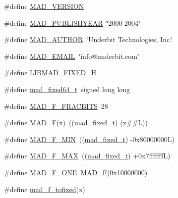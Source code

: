 \begin{DoxyCompactItemize}
\item 
\#define \hyperlink{mac_2config_2i386_2lib-src_2libmad_2mad_8h_ada05ce3820228a7974b7fbfa6a8ac3a2}{M\+A\+D\+\_\+\+V\+E\+R\+S\+I\+ON}
\item 
\#define \hyperlink{mac_2config_2i386_2lib-src_2libmad_2mad_8h_a11c58305e44a2eea0bcb291e89510feb}{M\+A\+D\+\_\+\+P\+U\+B\+L\+I\+S\+H\+Y\+E\+AR}~\char`\"{}2000-\/2004\char`\"{}
\item 
\#define \hyperlink{mac_2config_2i386_2lib-src_2libmad_2mad_8h_addecc1f19e32d59a7d61ce99a135161d}{M\+A\+D\+\_\+\+A\+U\+T\+H\+OR}~\char`\"{}Underbit Technologies, Inc.\char`\"{}
\item 
\#define \hyperlink{mac_2config_2i386_2lib-src_2libmad_2mad_8h_ad068c69e5eb1bc27489c1148e5aa57b1}{M\+A\+D\+\_\+\+E\+M\+A\+IL}~\char`\"{}info@underbit.\+com\char`\"{}
\item 
\#define \hyperlink{mac_2config_2i386_2lib-src_2libmad_2mad_8h_a0988464d4f3536054a7823bbd5a6fe18}{L\+I\+B\+M\+A\+D\+\_\+\+F\+I\+X\+E\+D\+\_\+H}
\item 
\#define \hyperlink{mac_2config_2i386_2lib-src_2libmad_2mad_8h_a283baa2bf012e39c892041bd3bc07479}{mad\+\_\+fixed64\+\_\+t}~signed long long
\item 
\#define \hyperlink{mac_2config_2i386_2lib-src_2libmad_2mad_8h_afe9f395501b4973ab536c13fb8235944}{M\+A\+D\+\_\+\+F\+\_\+\+F\+R\+A\+C\+B\+I\+TS}~28
\item 
\#define \hyperlink{mac_2config_2i386_2lib-src_2libmad_2mad_8h_a15f8a99ff8c6449921db3c15e8b80ed5}{M\+A\+D\+\_\+F}(x)~((\hyperlink{libmad_2fixed_8h_a8a4b50d6d4d6827b7a8c871db1cbfd78}{mad\+\_\+fixed\+\_\+t}) (x\#\#L))
\item 
\#define \hyperlink{mac_2config_2i386_2lib-src_2libmad_2mad_8h_a03929035ef601782a50acba22aaa2dac}{M\+A\+D\+\_\+\+F\+\_\+\+M\+IN}~((\hyperlink{libmad_2fixed_8h_a8a4b50d6d4d6827b7a8c871db1cbfd78}{mad\+\_\+fixed\+\_\+t}) -\/0x80000000\+L)
\item 
\#define \hyperlink{mac_2config_2i386_2lib-src_2libmad_2mad_8h_a67652605773e172bfd88a59f900c5b4f}{M\+A\+D\+\_\+\+F\+\_\+\+M\+AX}~((\hyperlink{libmad_2fixed_8h_a8a4b50d6d4d6827b7a8c871db1cbfd78}{mad\+\_\+fixed\+\_\+t}) +0x7fffffff\+L)
\item 
\#define \hyperlink{mac_2config_2i386_2lib-src_2libmad_2mad_8h_a0e0af3bf1ae6bf41e8e25eaa5606beba}{M\+A\+D\+\_\+\+F\+\_\+\+O\+NE}~\hyperlink{mac_2config_2i386_2lib-src_2libmad_2mad_8h_a15f8a99ff8c6449921db3c15e8b80ed5}{M\+A\+D\+\_\+F}(0x10000000)
\item 
\#define \hyperlink{mac_2config_2i386_2lib-src_2libmad_2mad_8h_a6c173fe62613adbb98f65cedeabf54e0}{mad\+\_\+f\+\_\+tofixed}(x)

\end{DoxyCompactItemize}
